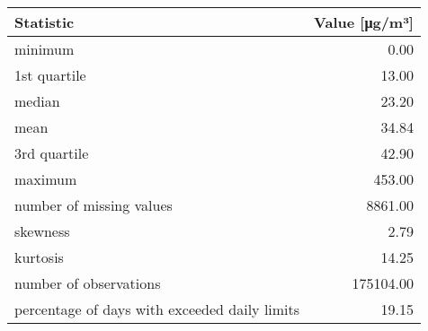 \begin{table}[ht]
\centering
\begin{tabular}{lr}
  \toprule
Statistic & Value [μg/m³] \\ 
  \midrule
minimum & 0.00 \\ 
  1st quartile & 13.00 \\ 
  median & 23.20 \\ 
  mean & 34.84 \\ 
  3rd quartile & 42.90 \\ 
  maximum & 453.00 \\ 
  number of missing values & 8861.00 \\ 
  skewness & 2.79 \\ 
  kurtosis & 14.25 \\ 
  number of observations & 175104.00 \\ 
  percentage of days with exceeded daily limits & 19.15 \\ 
   \bottomrule
\end{tabular}
\end{table}
